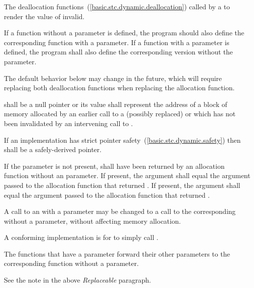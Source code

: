 \begin{itemdescr}
\pnum
\effects
The
deallocation functions~(\ref{basic.stc.dynamic.deallocation})
called by a
to render the value of  invalid.

\pnum
\replaceable
{}
If a function without a  parameter is defined,
the program should also define
the corresponding function with a  parameter.
If a function with a  parameter is defined,
the program shall also define
the corresponding version without the  parameter.
\begin{note}
The default behavior below may change in the future, which will require
replacing both deallocation functions when replacing the allocation function.
\end{note}

\pnum
\requires
{} shall be a null pointer or
its value shall represent the address of
a block of memory allocated by
an earlier call to a (possibly replaced)
or
which has not been invalidated by an intervening call to
.

\pnum
\requires
If an implementation has strict pointer safety~(\ref{basic.stc.dynamic.safety})
then  shall be a safely-derived pointer.

\pnum
\requires
If the  parameter is not present,
 shall have been returned by an allocation function
without an  parameter.
If present, the  argument
shall equal the  argument
passed to the allocation function that returned . 
If present, the  argument
shall equal the  argument
passed to the allocation function that returned .

\pnum
\required
A call to an 
with a  parameter
may be changed to
a call to the corresponding 
without a  parameter,
without affecting memory allocation.
\begin{note} A conforming implementation is for
 to simply call
. \end{note}

\pnum
{}
The functions that have a  parameter
forward their other parameters
to the corresponding function without a  parameter.
\begin{note} See the note in the above \textit{Replaceable} paragraph. \end{note}


\end{itemdescr}
